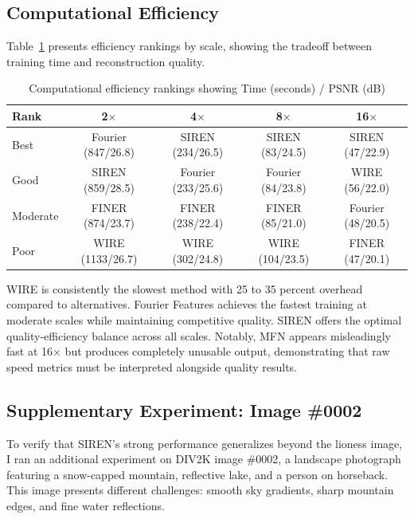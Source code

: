 \documentclass[a4paper,oneside,10pt,ngerman,english]{scrartcl}
\begin{document}
\cleardoubleoddpage
\subsection{Computational Efficiency}

Table~\ref{tab:efficiency} presents efficiency rankings by scale, showing the tradeoff between training time and reconstruction quality.

\begin{table}[htbp]
\centering
\caption{Computational efficiency rankings showing Time (seconds) / PSNR (dB)}
\label{tab:efficiency}
\begin{tabular}{lcccc}
\toprule
\textbf{Rank} & \textbf{2$\times$} & \textbf{4$\times$} & \textbf{8$\times$} & \textbf{16$\times$} \\
\midrule
Best & Fourier (847/26.8) & SIREN (234/26.5) & SIREN (83/24.5) & SIREN (47/22.9) \\
Good & SIREN (859/28.5) & Fourier (233/25.6) & Fourier (84/23.8) & WIRE (56/22.0) \\
Moderate & FINER (874/23.7) & FINER (238/22.4) & FINER (85/21.0) & Fourier (48/20.5) \\
Poor & WIRE (1133/26.7) & WIRE (302/24.8) & WIRE (104/23.5) & FINER (47/20.1) \\
\bottomrule
\end{tabular}
\end{table}

WIRE is consistently the slowest method with 25 to 35 percent overhead compared to alternatives. Fourier Features achieves the fastest training at moderate scales while maintaining competitive quality. SIREN offers the optimal quality-efficiency balance across all scales. Notably, MFN appears misleadingly fast at 16$\times$ but produces completely unusable output, demonstrating that raw speed metrics must be interpreted alongside quality results.


\subsection{Supplementary Experiment: Image \#0002}

To verify that SIREN's strong performance generalizes beyond the lioness image, I ran an additional experiment on DIV2K image \#0002, a landscape photograph featuring a snow-capped mountain, reflective lake, and a person on horseback. This image presents different challenges: smooth sky gradients, sharp mountain edges, and fine water reflections.
\end{document}
